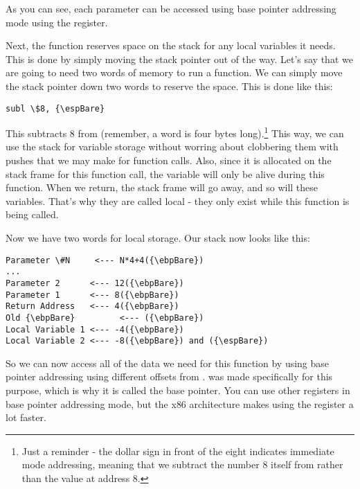 As you can see, each parameter can be accessed using base pointer addressing mode using the {\ebpRegIdx} register.

Next, the function reserves space on the stack for any local
variables it needs.
This is done by simply moving the stack pointer out of the way.
Let's say that we are going to need two words of memory
to run a function.  We can simply move the stack pointer down two
words to reserve the space.  This is done like this:

\begin{simpletyping}
\begin{lstlisting}
subl \$8, {\espBare}
\end{lstlisting}
\end{simpletyping}

This subtracts 8 from {\espReg} (remember, a word is four bytes 
long).\footnote{Just a reminder - the dollar sign in
front of the eight indicates immediate mode addressing, meaning
that we subtract the number 8 itself from {\espReg} rather than the value at
address 8.}  This way, we can use the stack for
variable storage without worring about clobbering them with pushes
that we may make for function calls.  Also, since it is allocated on 
the stack frame for this function call, the variable will only be 
alive during this function.  When we return, the stack frame will go
away, and so will these variables.  That's why they are called local -
they only exist while this function is being called.

Now we have two words for local storage.  Our stack now looks like this:

\begin{simpletyping}
\begin{lstlisting}
Parameter \#N     <--- N*4+4({\ebpBare})
...
Parameter 2      <--- 12({\ebpBare})
Parameter 1      <--- 8({\ebpBare})
Return Address   <--- 4({\ebpBare})
Old {\ebpBare}         <--- ({\ebpBare})
Local Variable 1 <--- -4({\ebpBare})
Local Variable 2 <--- -8({\ebpBare}) and ({\espBare})
\end{lstlisting}
\end{simpletyping}

So we can now access all of the data we need for this function
by using base pointer addressing using different offsets from {\ebpRegIdx}.
{\ebpRegIdx} was made specifically for this purpose, 
which is why it is called the base pointer.  You can use other
registers in base pointer addressing mode, but the x86 architecture
makes using the {\ebpRegIdx} register a lot faster.


